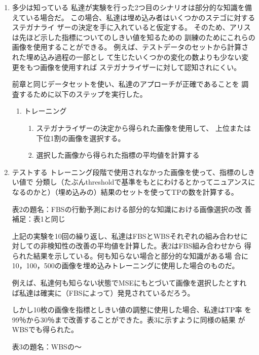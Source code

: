 \documentclass[a4j,fleqn,10pt]{jsarticle}
\begin{document}
\begin{enumerate}
 \item 多少は知っている
       私達が実験を行った2つ目のシナリオは部分的な知識を備えている場合だ。
       この場合、私達は埋め込み者はいくつかのステゴに対するステガナライ
       ザーの決定を手に入れていると仮定する。
       そのため、アリスは先ほど示した指標についてのしきい値を知るための
       訓練のためにこれらの画像を使用することができる。
       例えば、テストデータのセットから計算された埋め込み過程の一部とし
       て生じたいくつかの変化の数よりも少ない変更をもつ画像を使用すれば
       ステガナライザーに対して認知されにくい。
       
       前章と同じデータセットを使い、私達のアプローチが正確であることを
       調査するために以下のステップを実行した。

       \begin{enumerate}
        \item トレーニング
              \begin{enumerate}
               \item ステガナライザーの決定から得られた画像を使用して、
                     上位または下位1割の画像を選択する。
               \item 選択した画像から得られた指標の平均値を計算する
              \end{enumerate}
       \end{enumerate}

 \item テストする
       トレーニング段階で使用されなかった画像を使って、指標のしきい値で
       分類し（たぶんthresholdで基準をもとにわけるとかってニュアンスに
       なるのかと）（埋め込みの）結果のセットを使ってTPの数を計算する。
       
       表2の題名：FBSの行動予測における部分的な知識における画像選択の改
       善
       補足：表1と同じ

       上記の実験を10回の繰り返し、私達はFBSとWBSそれぞれの組み合わせに
       対しての非検知性の改善の平均値を計算した。表2はFBS組み合わせから
       得られた結果を示している。何も知らない場合と部分的な知識がある場
       合に10，100，500の画像を埋め込みトレーニングに使用した場合のものだ。

       例えば、私達何も知らない状態でMSEにもとづいて画像を選択したとすれ
       ば私達は確実に（FBSによって）発見されているだろう。

       しかし10枚の画像を指標としきい値の調整に使用した場合、私達はTP率
       を99％から30％まで改善することができた。表3に示すように同様の結果
       がWBSでも得られた。

       表3の題名：WBSの〜

\end{enumerate}
\end{document}
